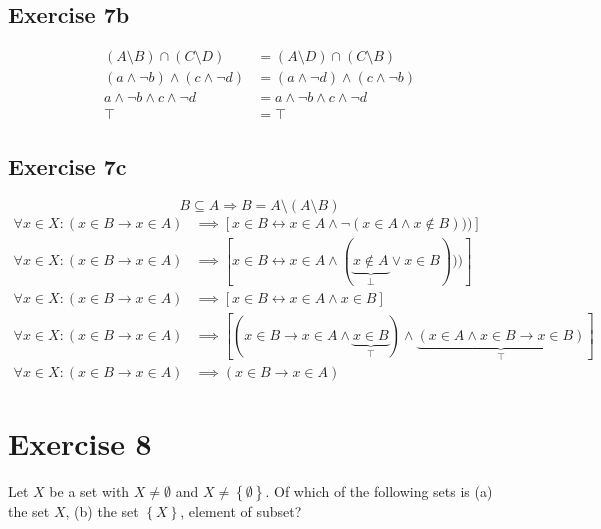 \documentclass[a4paper]{article}
\theoremstyle{definition}
\newcommand\set[1]{\left\{#1\right\}}
\begin{document}
\subsection{Exercise 7b}
\begin{align*}
  (A \setminus B) \cap (C \setminus D) &= (A \setminus D) \cap (C \setminus B) \\
  (a \land \neg b) \land (c \land \neg d) &= (a \land \neg d) \land (c \land \neg b) \\
  a \land \neg b \land c \land \neg d &= a \land \neg b \land c \land \neg d \\
  \top &= \top
\end{align*}

\subsection{Exercise 7c}
\[ B \subseteq A \Rightarrow B = A \setminus (A \setminus B) \]
%
\begin{align*}
  \forall x \in X: (x \in B \rightarrow x \in A) &\implies \left[
          x \in B \leftrightarrow x \in A \land \neg (x \in A \land x \not\in B)))
      \right] \\
  \forall x \in X: (x \in B \rightarrow x \in A) &\implies \left[
          x \in B \leftrightarrow x \in A \land (\underbrace{x \not\in A}_{\bot} \lor x \in B)))
      \right] \\
  \forall x \in X: (x \in B \rightarrow x \in A) &\implies \left[
          x \in B \leftrightarrow x \in A \land x \in B
      \right] \\
  \forall x \in X: (x \in B \rightarrow x \in A) &\implies \left[
          (x \in B \rightarrow x \in A \land \underbrace{x \in B}_{\top}) \land
          \underbrace{(x \in A \land x \in B \rightarrow x \in B)}_{\top}
      \right] \\
  \forall x \in X: (x \in B \rightarrow x \in A) &\implies (x \in B \rightarrow x \in A)
\end{align*}


\section{Exercise 8}

\begin{ex}
  Let $X$ be a set with $X \neq \emptyset$ and $X \neq \set{\emptyset}$. Of which of the following sets is
  (a) the set $X$, (b) the set $\set{X}$, element of subset?
\end{ex}
\end{document}
